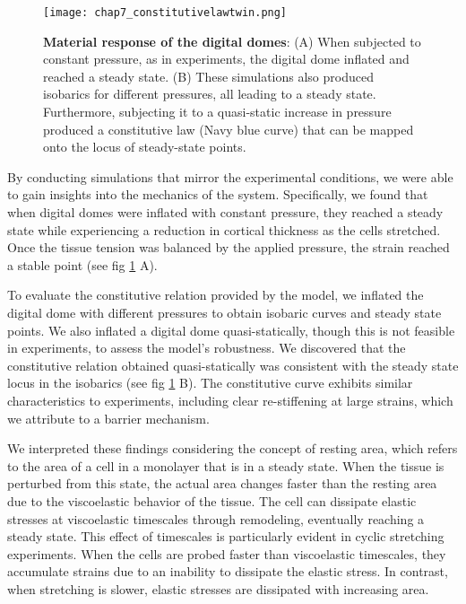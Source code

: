 \begin{figure}
	\centering
	\texttt{[image: chap7\_constitutivelawtwin.png]}
	\caption{\label{fig_7_7} \textbf{Material response of the digital domes}: (A)  When subjected to constant pressure, as in experiments, the digital dome inflated and reached a steady state. (B)  These simulations also produced isobarics for different pressures, all leading to a steady state. Furthermore, subjecting it to a quasi-static increase in pressure produced a constitutive law (Navy blue curve) that can be mapped onto the locus of steady-state points.}
\end{figure}


By conducting simulations that mirror the experimental conditions, we were able to gain insights into the mechanics of the system. Specifically, we found that when digital domes were inflated with constant pressure, they reached a steady state while experiencing a reduction in cortical thickness as the cells stretched. Once the tissue tension was balanced by the applied pressure, the strain reached a stable point (see fig \ref{fig_7_7} A).

To evaluate the constitutive relation provided by the model, we inflated the digital dome with different pressures to obtain isobaric curves and steady state points. We also inflated a digital dome quasi-statically, though this is not feasible in experiments, to assess the model's robustness. We discovered that the constitutive relation obtained quasi-statically was consistent with the steady state locus in the isobarics  (see fig \ref{fig_7_7} B). The constitutive curve exhibits similar characteristics to experiments, including clear re-stiffening at large strains, which we attribute to a barrier mechanism.

We interpreted these findings considering the concept of resting area, which refers to the area of a cell in a monolayer that is in a steady state. When the tissue is perturbed from this state, the actual area changes faster than the resting area due to the viscoelastic behavior of the tissue. The cell can dissipate elastic stresses at viscoelastic timescales through remodeling, eventually reaching a steady state. This effect of timescales is particularly evident in cyclic stretching experiments. When the cells are probed faster than viscoelastic timescales, they accumulate strains due to an inability to dissipate the elastic stress. In contrast, when stretching is slower, elastic stresses are dissipated with increasing area.

